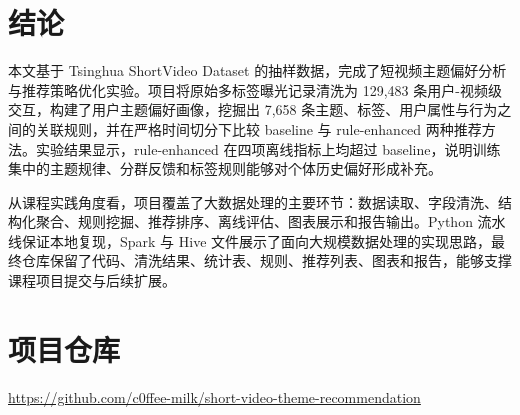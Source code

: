 \documentclass[UTF8,a4paper,12pt,fontset=none]{ctexart}
\begin{document}
\section{结论}

本文基于 Tsinghua ShortVideo Dataset 的抽样数据，完成了短视频主题偏好分析与推荐策略优化实验。项目将原始多标签曝光记录清洗为 129,483 条用户-视频级交互，构建了用户主题偏好画像，挖掘出 7,658 条主题、标签、用户属性与行为之间的关联规则，并在严格时间切分下比较 baseline 与 rule-enhanced 两种推荐方法。实验结果显示，rule-enhanced 在四项离线指标上均超过 baseline，说明训练集中的主题规律、分群反馈和标签规则能够对个体历史偏好形成补充。

从课程实践角度看，项目覆盖了大数据处理的主要环节：数据读取、字段清洗、结构化聚合、规则挖掘、推荐排序、离线评估、图表展示和报告输出。Python 流水线保证本地复现，Spark 与 Hive 文件展示了面向大规模数据处理的实现思路，最终仓库保留了代码、清洗结果、统计表、规则、推荐列表、图表和报告，能够支撑课程项目提交与后续扩展。

\section*{项目仓库}

\begin{center}
\url{https://github.com/c0ffee-milk/short-video-theme-recommendation}
\end{center}
\end{document}
